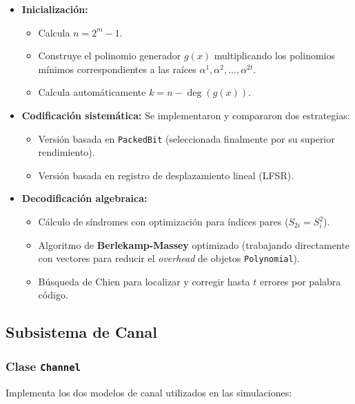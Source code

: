 \begin{itemize}
    \item \textbf{Inicialización:}
    \begin{itemize}
        \item Calcula $n = 2^m - 1$.
        \item Construye el polinomio generador $g(x)$ multiplicando los polinomios mínimos correspondientes a las raíces $\alpha^1, \alpha^2, \dots, \alpha^{2t}$.
        \item Calcula automáticamente $k = n - \deg(g(x))$.
    \end{itemize}

    \item \textbf{Codificación sistemática:}
    Se implementaron y compararon dos estrategias:
    \begin{itemize}
        \item Versión basada en \texttt{PackedBit} (seleccionada finalmente por su superior rendimiento).
        \item Versión basada en registro de desplazamiento lineal (LFSR).
    \end{itemize}

    \item \textbf{Decodificación algebraica:}
    \begin{itemize}
        \item Cálculo de síndromes con optimización para índices pares ($S_{2i} = S_i^2$).
        \item Algoritmo de \textbf{Berlekamp-Massey} optimizado (trabajando directamente con vectores para reducir el \textit{overhead} de objetos \texttt{Polynomial}).
        \item Búsqueda de Chien para localizar y corregir hasta $t$ errores por palabra código.
    \end{itemize}
\end{itemize}

\subsection{Subsistema de Canal}

\subsubsection{Clase \texttt{Channel}}

Implementa los dos modelos de canal utilizados en las simulaciones:

